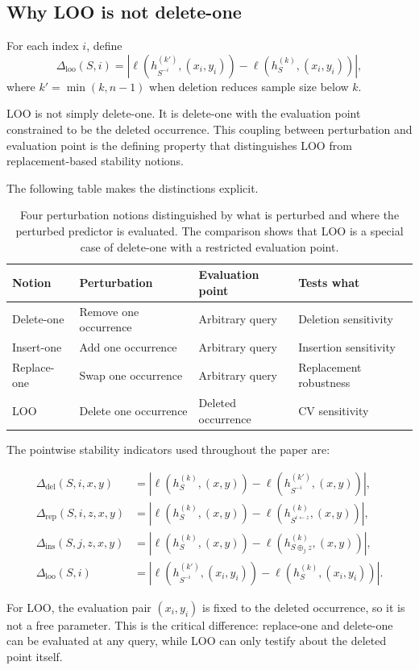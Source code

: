 \subsection{Why LOO is not delete-one}

\begin{definition}
For each index $i$, define
\[
\Delta_{\mathrm{loo}}(S, i)
=
\left| \ell(h_{S^{-i}}^{(k')}, (x_i, y_i)) - \ell(h_S^{(k)}, (x_i, y_i)) \right|,
\]
where $k' = \min(k, n-1)$ when deletion reduces sample size below $k$.
\end{definition}

LOO is not simply delete-one.  It is delete-one with the evaluation point
constrained to be the deleted occurrence.  This coupling between perturbation
and evaluation point is the defining property that distinguishes LOO from
replacement-based stability notions.

The following table makes the distinctions explicit.

\begin{table}[t]
\centering
\small
\begin{tabularx}{\linewidth}{@{}lXXl@{}}
\toprule
Notion & Perturbation & Evaluation point & Tests what \\
\midrule
Delete-one & Remove one occurrence & Arbitrary query & Deletion sensitivity \\
Insert-one & Add one occurrence & Arbitrary query & Insertion sensitivity \\
Replace-one & Swap one occurrence & Arbitrary query & Replacement robustness \\
LOO & Delete one occurrence & Deleted occurrence & CV sensitivity \\
\bottomrule
\end{tabularx}
\caption{Four perturbation notions distinguished by what is perturbed and where
the perturbed predictor is evaluated.  The comparison shows that LOO is a
special case of delete-one with a restricted evaluation point.}
\label{tab:perturbation-semantics}
\end{table}

The pointwise stability indicators used throughout the paper are:

\begin{align*}
\Delta_{\mathrm{del}}(S, i, x, y) &=
\left| \ell(h_S^{(k)}, (x, y)) - \ell(h_{S^{-i}}^{(k')}, (x, y)) \right|,
\\
\Delta_{\mathrm{rep}}(S, i, z, x, y) &=
\left| \ell(h_S^{(k)}, (x, y)) - \ell(h_{S^{i \leftarrow z}}^{(k)}, (x, y)) \right|,
\\
\Delta_{\mathrm{ins}}(S, j, z, x, y) &=
\left| \ell(h_S^{(k)}, (x, y)) - \ell(h_{S \oplus_j z}^{(k)}, (x, y)) \right|,
\\
\Delta_{\mathrm{loo}}(S, i) &=
\left| \ell(h_{S^{-i}}^{(k')}, (x_i, y_i)) - \ell(h_S^{(k)}, (x_i, y_i)) \right|.
\end{align*}

For LOO, the evaluation pair $(x_i, y_i)$ is fixed to the deleted occurrence,
so it is not a free parameter.  This is the critical difference: replace-one
and delete-one can be evaluated at any query, while LOO can only testify about
the deleted point itself.

